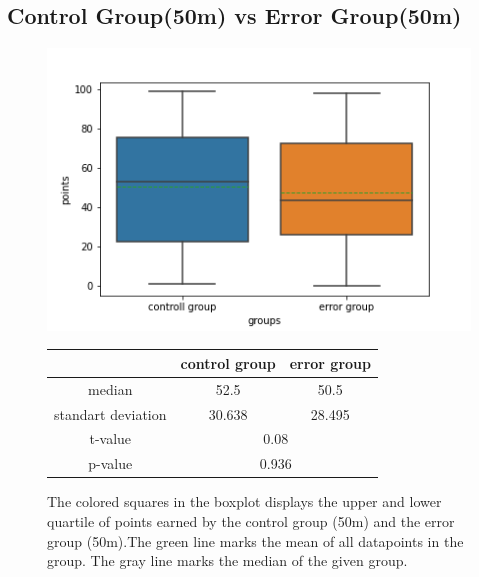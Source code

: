 \documentclass[runningheads]{llncs}
\begin{document}
\subsection{Control Group(50m) vs Error Group(50m) }
\begin{figure}
    \begin{minipage}{0.43\textwidth}        
        \includegraphics[width=\textwidth]{code/generate/all.png}
        \caption{The colored squares in the boxplot displays
        the upper and lower quartile of points earned by the control group (50m) and
        the error group (50m).The green line marks the mean of all datapoints in the group.
        The gray line marks the median  of the given group.} \label{fig4}
    \end{minipage}
\hfill
\begin{minipage}{0.43\textwidth}
\begin{tabular}[]{| c | c | c |}
        \hline
        & control group & error group \\
        \hline
        median & 52.5&50.5 \\
        \hline
        standart deviation & 30.638&28.495 \\
        \hline
        t-value & \multicolumn{2}{c|}{0.08} \\
        \hline
        p-value & \multicolumn{2}{c|}{0.936} \\
        \hline            
\end{tabular}
\end{minipage}
\end{figure}
\end{document}

